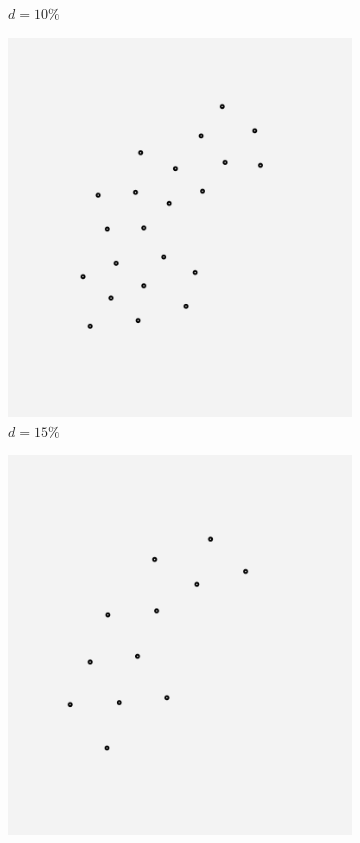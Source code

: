 \begin{figure}[H]
\begin{subfigure}[b]{0.24\linewidth}
	\caption{\small $d=10\%$} 
    \label{fig:10_sweden} 
    \vspace{4ex}
  \end{subfigure}%
  \begin{subfigure}[b]{0.24\linewidth}
    \centering
    \includegraphics[width=0.9\linewidth]{Pictures/15_sweden} 
    \caption{\small $d=15\%$} 
    \label{fig:15_sweden} 
    \vspace{4ex}
  \end{subfigure}
  \begin{subfigure}[b]{0.24\linewidth}
  	\centering
  	\includegraphics[width=0.9\linewidth]{Pictures/20_sweden} 

\end{subfigure}
\end{figure}
